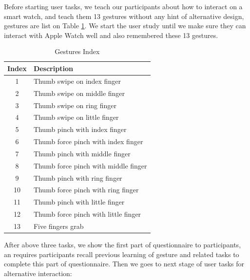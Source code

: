 Before starting user tasks, we teach our participants about how to interact on a smart watch, and teach them 13 gestures without any hint of alternative design, gestures are list on Table \ref{table:gesture}. We start the user study until we make sure they can interact with Apple Watch well and also remembered these 13 gestures.

\begin{table}[H]
    \small
    \kaishu
    \centering
    \setlength{\belowcaptionskip}{10pt}
    \caption{Gestures Index}

    \begin{tabular}{c l}
        \toprule
        \textbf{Index}        & \textbf{Description} \\
        \hline
        1     & Thumb swipe on index finger \\
        2     & Thumb swipe on middle finger \\
        3     & Thumb swipe on ring finger \\
        4     & Thumb swipe on little finger \\
        5     & Thumb pinch with index finger \\
        6     & Thumb force pinch with index finger \\
        7     & Thumb pinch with middle finger \\
        8     & Thumb force pinch with middle finger  \\
        9     & Thumb pinch with ring finger  \\
        10    & Thumb force pinch with ring finger \\
        11    & Thumb pinch with little finger \\
        12    & Thumb force pinch with little finger \\
        13    & Five fingers grab \\
        \bottomrule
    \end{tabular}

    \label{table:gesture}
\end{table}

After above three tasks, we show the first part of questionnaire to participants, an requires participants recall previous learning of gesture and related tasks to complete this part of questionnaire. Then we goes to next stage of user tasks for alternative interaction:

